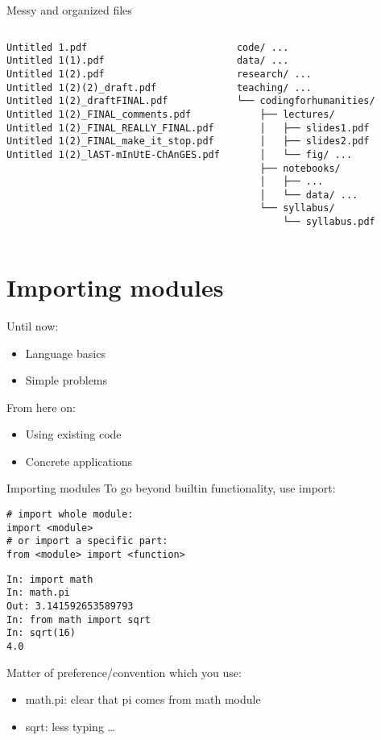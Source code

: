 \documentclass[aspectratio=169,usenames,dvipsnames]{beamer}
\begin{document}
\begin{frame}[fragile]{Messy and organized files}
\begin{columns}
\begin{verbatim}
Untitled 1.pdf
Untitled 1(1).pdf
Untitled 1(2).pdf
Untitled 1(2)(2)_draft.pdf
Untitled 1(2)_draftFINAL.pdf
Untitled 1(2)_FINAL_comments.pdf
Untitled 1(2)_FINAL_REALLY_FINAL.pdf
Untitled 1(2)_FINAL_make_it_stop.pdf
Untitled 1(2)_lAST-mInUtE-ChAnGES.pdf
\end{verbatim}
\pause
{}
\begin{verbatim}
code/ ...
data/ ...
research/ ...
teaching/ ...
└── codingforhumanities/
    ├── lectures/
    │   ├── slides1.pdf
    │   ├── slides2.pdf
    │   └── fig/ ...
    ├── notebooks/
    │   ├── ...
    │   └── data/ ...
    └── syllabus/
        └── syllabus.pdf
\end{verbatim}
\end{columns}
\end{frame}


\section{Importing modules}
\frame{\tableofcontents[currentsection]}

\begin{frame}
    Until now:
        \begin{itemize}
            \item Language basics
            \item Simple problems
        \end{itemize}
    \pause
    From here on:
        \begin{itemize}
            \item Using existing code
            \item Concrete applications
        \end{itemize}
\end{frame}

\begin{frame}[fragile]{Importing modules}
To go beyond builtin functionality, use import:
\begin{lstlisting}
# import whole module:
import <module>
# or import a specific part:
from <module> import <function>
\end{lstlisting}

\pause
\begin{lstlisting}
In: import math
In: math.pi
Out: 3.141592653589793
In: from math import sqrt
In: sqrt(16)
4.0
\end{lstlisting}

Matter of preference/convention which you use:
\begin{itemize}
	\item math.pi: clear that pi comes from math module
	\item sqrt: less typing \dots
\end{itemize}
\end{frame}
\end{document}
